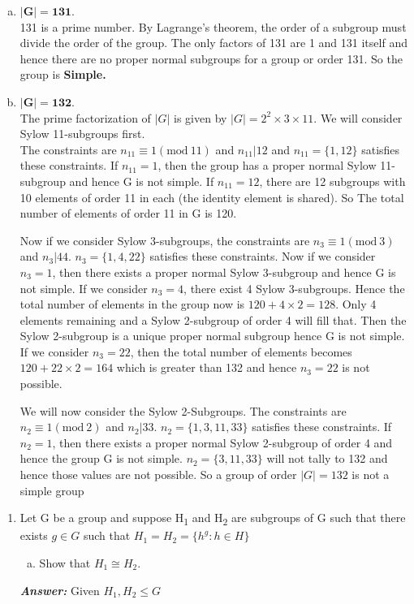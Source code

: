 \documentclass[11pt,a4paper]{article}
\begin{document}
\begin{enumerate}[1.]
\begin{enumerate}[2.]
\begin{flushleft}
\begin{enumerate}[(a)]
			\item $\mathbf{|G| = 131}$.\\
			131 is a prime number. By Lagrange's theorem, the order of a subgroup must divide the order of the group. The only factors of 131 are 1 and 131 itself and hence there are no proper normal subgroups for a group or order 131. So the group is \textbf{Simple.}
			
			\item $\mathbf{|G| = 132}$.\\
			
			The prime factorization of $|G|$ is given by $|G| = 2^2\times3\times11$. We will consider Sylow 11-subgroups first.\\
			The constraints are $n_{11} \equiv 1(\textrm{mod}\ 11)$ and $n_{11}|12$ and $n_{11} = \{1, 12\}$ satisfies these constraints. If $n_{11} = 1$, then the group has a proper normal Sylow 11-subgroup and hence G is not simple. If $n_{11} = 12$, there are 12 subgroups with 10 elements of order 11 in each (the identity element is shared). So The total number of elements of order 11 in G is 120.
			
			Now if we consider Sylow 3-subgroups, the constraints are $n_3 \equiv 1(\textrm{mod}\ 3)$ and $n_3|44$. $n_3 = \{1, 4, 22\}$ satisfies these constraints. Now if we consider $n_3 = 1$, then there exists a proper normal Sylow 3-subgroup and hence G is not simple. If we consider $n_3 = 4$, there exist 4 Sylow 3-subgroups. Hence the total number of elements in the group now is $120 + 4\times2 = 128$. Only 4 elements remaining and a Sylow 2-subgroup of order 4 will fill that. Then the Sylow 2-subgroup is a unique proper normal subgroup hence G is not simple. If we consider $n_3 = 22$, then the total number of elements becomes $120 + 22\times2 = 164$ which is greater than 132 and hence $n_3 = 22$ is not possible.
			
			We will now consider the Sylow 2-Subgroups. The constraints are $n_2 \equiv 1(\textrm{mod}\ 2)$ and $n_2|33$. $n_2 = \{1, 3, 11, 33\}$ satisfies these constraints. If $n_2 = 1$, then there exists a proper normal Sylow 2-subgroup of order 4 and hence the group G is not simple. $n_2 = \{3, 11, 33\}$ will not tally to 132 and hence those values are not possible. So a group of order $|G| = 132$ is not a simple group
		\end{enumerate}
	\end{flushleft}
\end{enumerate}
	\begin{enumerate}[4.]
		\item Let G be a group and suppose H\textsubscript{1} and H\textsubscript{2} are subgroups of G such that there exists $g \in G$ such that $H_1 = H_2 = \{h^g : h \in H\}$
		\begin{enumerate}[(a)]
			\item Show that $H_1 \cong H_2 $.
		\end{enumerate}
		\begin{flushleft}
			\textbf{\textit{Answer:}}
			Given $H_1, H_2 \le G$ 
			

\end{flushleft}
\end{enumerate}
\end{enumerate}
\end{document}
